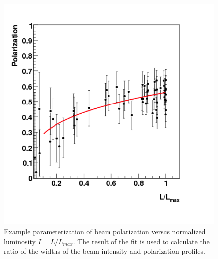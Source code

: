 \begin{figure}
  \centering
  \includegraphics{figures/pol_l_lmax}
  \caption{Example parameterization of beam polarization versus normalized luminosity $I = L/L_{max}$.  The result of the fit is used to calculate the ratio of the widths of the beam intensity and polarization profiles.}
  \label{fig:pol_l_lmax}
\end{figure}

